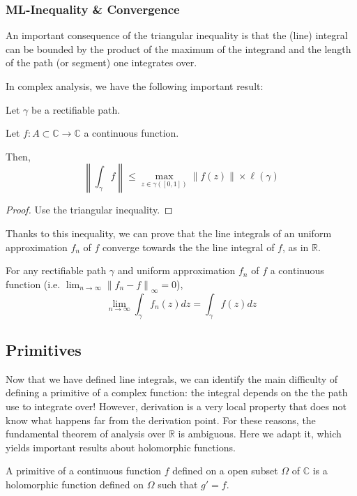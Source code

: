 \subsubsection{ML-Inequality \& Convergence}

An important consequence of the triangular inequality is that the (line) integral can be bounded by the product of the maximum of the integrand and the length of the path (or segment) one integrates over.

In complex analysis, we have the following important result:

\begin{thm*}[M-L Inequality]
    Let $\gamma$ be a rectifiable path.

    Let $f: A\subset\mathbb{C} \rightarrow \mathbb{C}$ a continuous function.

    Then, 
    $$\boxed{\left\| \int_\gamma f \right\| \leq \max_{z\in \gamma([0,1])}{\| f(z)\|} \times \ell(\gamma)}$$
\end{thm*}

\begin{proof}
    Use the triangular inequality.
\end{proof}

Thanks to this inequality, we can prove that the line integrals of an uniform approximation $f_n$ of $f$ converge towards the the line integral of $f$, as in $\mathbb{R}$.

\begin{thm*}
    For any rectifiable path $\gamma$ and uniform approximation $f_n$ of $f$ a continuous function (i.e. $\lim_{n\rightarrow \infty}\left\| f_n -f \right \|_{\infty} = 0$), 
    $$ \lim_{n\rightarrow\infty} \int_\gamma f_n(z)dz = \int_\gamma f(z)dz $$
\end{thm*}

\subsection{Primitives}

Now that we have defined line integrals, we can identify the main difficulty of defining a primitive of a complex function: the integral depends on the the path use to integrate over! However, derivation is a very local property that does not know what happens far from the derivation point. For these reasons, the fundamental theorem of analysis over $\mathbb{R}$ is ambiguous. Here we adapt it, which yields important results about holomorphic functions.

\begin{defi}
    A primitive of a continuous function $f$ defined on a open subset $\Omega$ of $\mathbb{C}$ is a holomorphic function defined on $\Omega$ such that $g'=f$.
\end{defi}

